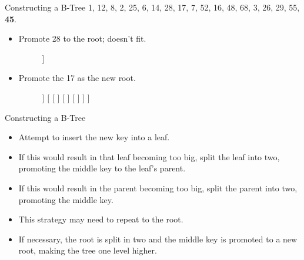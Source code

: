\documentclass[14pt,aspectratio=1610]{beamer}
\begin{document}
\begin{frame}[t]{Constructing a B-Tree}
1, 12, 8, 2, 25, 6, 14, 28, 17, 7, 52, 16, 48, 68, 3, 26, 29, 55, \alert{\textbf{45}}.
\begin{itemize}\small{}
  \item
    Promote 28 to the root; doesn't fit.
    \begin{figure}
    \centering
      \begin{forest}
        [\BTreeNode{3, 8, 17}\BTreeSep\BTreeVal<red!75>{28}\BTreeVal*{48}%
          [
            \BTreeNode{1, 2}%
          ]
          [
            \BTreeNode{6, 7}%
          ]
          [
            \BTreeNode{12, 14, 16}%
          ]
          [
            \BTreeNode{25, 26}
          ]
          [
            \BTreeNode{29, 45}%
          ]
          [
            \BTreeNode{52, 55, 68}%
          ]
        ]
      \end{forest}
    \end{figure}
  \item<2->
    Promote the 17 as the new root.
    \begin{figure}
    \centering
      \begin{forest}
        [\BTreeNode{17}%
          [\BTreeNode{3, 8}
            [
              \BTreeNode{1, 2}%
            ]
            [
              \BTreeNode{6, 7}%
            ]
            [
              \BTreeNode{12, 14, 16}%
            ]
          ]
          [
            [
            ]
            [
            ]
            [
            ]
          ]
        ]
      \end{forest}
    \end{figure}
\end{itemize}
\end{frame}

\begin{frame}{Constructing a B-Tree}
\begin{itemize}[<+->]
  \item
    Attempt to insert the new key into a leaf.
  \item
    If this would result in that leaf becoming too big, split the leaf into two, promoting the middle key to the leaf's parent.
  \item
    If this would result in the parent becoming too big, split the parent into two, promoting the middle key.
  \item
    This strategy may need to repeat to the root.
  \item
    If necessary, the root is split in two and the middle key is promoted to a new root, making the tree one level higher.
\end{itemize}
\end{frame}
\end{document}
